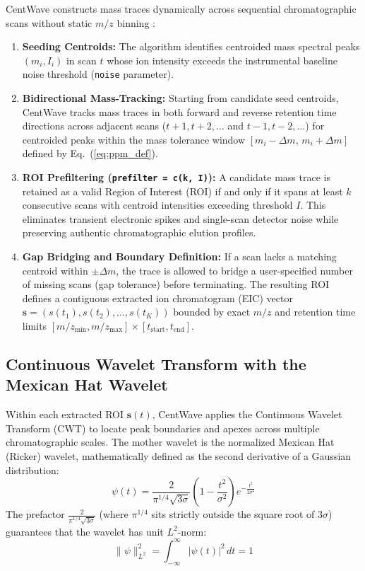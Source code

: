 \documentclass[11pt,twoside,openright]{book}
\begin{document}
CentWave constructs mass traces dynamically across sequential chromatographic scans without static $m/z$ binning \cite{tautenhahn2008highly}:
\begin{enumerate}
    \item \textbf{Seeding Centroids:} The algorithm identifies centroided mass spectral peaks $(m_i, I_i)$ in scan $t$ whose ion intensity exceeds the instrumental baseline noise threshold (\texttt{noise} parameter).
    \item \textbf{Bidirectional Mass-Tracking:} Starting from candidate seed centroids, CentWave tracks mass traces in both forward and reverse retention time directions across adjacent scans ($t+1, t+2, \dots$ and $t-1, t-2, \dots$) for centroided peaks within the mass tolerance window $[m_i - \Delta m, \, m_i + \Delta m]$ defined by Eq.~(\ref{eq:ppm_def}).
    \item \textbf{ROI Prefiltering (\texttt{prefilter = c(k, I)}):} A candidate mass trace is retained as a valid Region of Interest (ROI) if and only if it spans at least $k$ consecutive scans with centroid intensities exceeding threshold $I$. This eliminates transient electronic spikes and single-scan detector noise while preserving authentic chromatographic elution profiles.
    \item \textbf{Gap Bridging and Boundary Definition:} If a scan lacks a matching centroid within $\pm \Delta m$, the trace is allowed to bridge a user-specified number of missing scans (gap tolerance) before terminating. The resulting ROI defines a contiguous extracted ion chromatogram (EIC) vector $\mathbf{s} = (s(t_1), s(t_2), \dots, s(t_K))$ bounded by exact $m/z$ and retention time limits $[m/z_{\min}, m/z_{\max}] \times [t_{\text{start}}, t_{\text{end}}]$.
\end{enumerate}

\subsection{Continuous Wavelet Transform with the Mexican Hat Wavelet}

Within each extracted ROI $\mathbf{s}(t)$, CentWave applies the Continuous Wavelet Transform (CWT) to locate peak boundaries and apexes across multiple chromatographic scales. The mother wavelet is the normalized Mexican Hat (Ricker) wavelet, mathematically defined as the second derivative of a Gaussian distribution:
\begin{equation}
\label{eq:mexican_hat}
\psi(t) = \frac{2}{\pi^{1/4} \sqrt{3\sigma}} \left( 1 - \frac{t^2}{\sigma^2} \right) e^{-\frac{t^2}{2\sigma^2}}
\end{equation}
The prefactor $\frac{2}{\pi^{1/4} \sqrt{3\sigma}}$ (where $\pi^{1/4}$ sits strictly outside the square root of $3\sigma$) guarantees that the wavelet has unit $L^2$-norm:
\begin{equation}
\label{eq:l2_norm}
\|\psi\|_{L^2}^2 = \int_{-\infty}^{\infty} |\psi(t)|^2 \, dt = 1
\end{equation}
\end{document}
